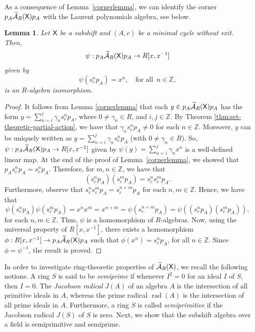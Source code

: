 \documentclass[a4paper,12pt]{amsart}
\newtheorem{lemma}[equation]{Lemma}
\theoremstyle{definition}
\theoremstyle{remark}
\numberwithin{equation}{section}
\newcommand{\osf}{{\normalfont \textsf{X}}}
\newcommand{\ualgshift}{\TCA_R(\osf)}
\newcommand{\Z}{\mathbb{Z}}
\newcommand{\CA}{\mathcal{A}}
\newcommand{\TCA}{\widetilde{\CA}}
\begin{document}
As a consequence of Lemma~\ref{cornerlemma}, we can identify the corner $p_A\ualgshift p_A$ with the Laurent polynomials algebra, see below.

\begin{lemma}\label{lem-Laurent-pol} Let $\osf$ be a subshift and $(A,c)$ be a minimal cycle without exit. Then,  $$\psi:p_A\ualgshift p_A\to R[x,x^{-1}]$$ given by
\[\psi(s^n_cp_A)=x^n, \quad \text{for all } \,n\in \Z,\]
is an $R$-algebra isomorphism.
\end{lemma}
\begin{proof} It follows from Lemma \ref{cornerlemma} that each $y\in p_A \ualgshift p_A$ has the form $y=\sum\limits_{n=i}^j\gamma_n s_c^n p_A$, where $0\neq \gamma_n\in R$, and $i,j\in \Z$. By Theorem \ref{thm:set-theoretic-partial-action},  we have that $\gamma_ns_c^n p_A\neq 0$ for each $n\in\Z$. Moreover, $y$ can be uniquely written as $y=\sum\limits_{n=i}^j\gamma_n s_c^n p_A$ (with $0\neq \gamma_n \in  R$).
So, $\psi:p_A \ualgshift p_A \rightarrow R[x,x^{-1}]$ given by $\psi(y)=\sum\limits_{n=i}^j \gamma_n x^n$ is a well-defined linear map. 
At the end of the proof of Lemma~\ref{cornerlemma}, we showed that $p_A s_c^n p_A=s_c^n p_A$. Therefore, for $m,n\in \Z$, we have that $$(s_c^np_A)(s_c^m p_A)=s_c^ns_c^mp_A.$$
Furthermore, observe that $s_c^ns_c^m p_A=s_c^{n+m}p_A$ for each $n,m\in \Z$. 
Hence, we have that $$\psi(s_c^np_A)\psi(s_c^mp_A)=x^nx^m=x^{n+m}=\psi(s_c^{n+m}p_A)=\psi((s_c^np_A)(s_c^mp_A)),$$ for each $n,m\in \Z$. 
Thus, $\psi$ is a homomorphism of $R$-algebras.
Now, using the universal property of $R[x,x^{-1}]$, there exists a homomorphism $\phi:R[x,x^{-1}]\rightarrow p_A \ualgshift p_A$ such that $\phi(x^n)=s_c^np_A$, for all $n\in \Z$. Since $\phi=\psi^{-1}$, the result is proved.
\end{proof}

In order to investigate ring-theoretic properties of $\ualgshift$, we recall the following notions. A ring $S$ is said to be \emph{semiprime} if whenever $I^2=0$ for an ideal $I$ of $S$, then $I=0$. 
 The \emph{Jacobson radical} $J(A)$ of an algebra $A$ is the intersection of all primitive ideals in $A$, whereas the prime radical $\operatorname{rad}(A)$ is the intersection of all prime ideals in $A$. Furthermore, a ring $S$ is called \emph{semiprimitive} if the Jacobson radical $J(S)$ of $S$ is zero. Next, we show that the subshift algebra over a field is semiprimitive and semiprime.
\end{document}
